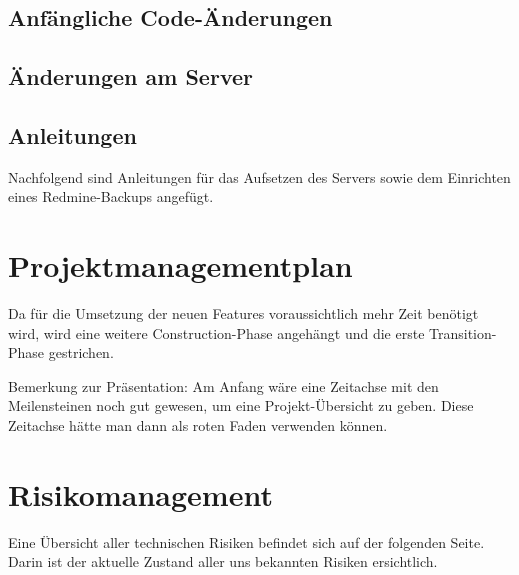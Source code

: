 \documentclass[12pt, a4paper]{report}
\begin{document}
	\section{Anfängliche Code-Änderungen}
	\label{sec:AnfaenglicheCodeAenderungen}
	
	
	\section{Änderungen am Server}
	\label{sec:AenderungenAmServer}
	
	
	\section{Anleitungen}
	\label{sec:Anleitungen}
	Nachfolgend sind Anleitungen für das Aufsetzen des Servers sowie dem Einrichten eines Redmine-Backups angefügt.
	
	
	
	
	
	\chapter{Projektmanagementplan}
	
	Da für die Umsetzung der neuen Features voraussichtlich mehr Zeit benötigt wird, wird eine weitere Construction-Phase angehängt und die erste Transition-Phase gestrichen.
	
	Bemerkung zur Präsentation:
	Am Anfang wäre eine Zeitachse mit den Meilensteinen noch gut gewesen, um eine Projekt-Übersicht zu geben. Diese Zeitachse hätte man dann als roten Faden verwenden können.
	
	
	
	\chapter{Risikomanagement}
	Eine Übersicht aller technischen Risiken befindet sich auf der folgenden Seite. Darin ist der aktuelle Zustand aller uns bekannten Risiken ersichtlich.
	
\end{document}
